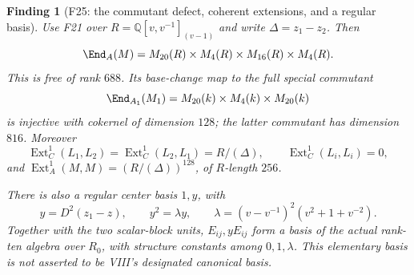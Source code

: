 \documentclass[11pt,a4paper]{article}
\newcommand{\Q}{\mathbb Q}\newcommand{\Z}{\mathbb Z}\newcommand{\C}{\mathbb C}\newcommand{\N}{\mathbb N}\newcommand{\F}{\mathbb F}
\newcommand{\fid}[1]{\textsf{#1}}\newcommand{\gate}[1]{\textsf{#1}}
\theoremstyle{named}\newtheorem{finding}{Finding}[section]
\theoremstyle{definition}\newtheorem{definition}[finding]{Definition}
\theoremstyle{remark}\newtheorem{remark}[finding]{Remark}
\begin{document}
\begin{finding}[\fid{F25}: the commutant defect, coherent extensions, and a regular basis]\label{f:r3deformation}
Use \fid{F21} over $R=\Q[v,v^{-1}]_{(v-1)}$ and write
$\Delta=z_1-z_2$. Then
\[
 \End_A(M)=M_{20}(R)\times M_4(R)\times M_{16}(R)\times M_4(R).
\]
This is free of rank $688$. Its base-change map to the full special
commutant
\[
 \End_{A_1}(M_1)=M_{20}(k)\times M_4(k)\times M_{20}(k)
\]
is injective with cokernel of dimension $128$; the latter commutant has
dimension $816$. Moreover
\[
 \operatorname{Ext}^1_C(L_1,L_2)
 =\operatorname{Ext}^1_C(L_2,L_1)=R/(\Delta),\qquad
 \operatorname{Ext}^1_C(L_i,L_i)=0,
\]
and $\operatorname{Ext}^1_A(M,M)=(R/(\Delta))^{128}$, of $R$-length $256$.

There is also a regular center basis $1,y$, with
\begin{equation}\label{eq:r3basis}
 y=D^2(z_1-z),\qquad
 y^2=\lambda y,\qquad
 \lambda=(v-v^{-1})^2(v^2+1+v^{-2}).
\end{equation}
Together with the two scalar-block units, $E_{ij},yE_{ij}$ form a basis
of the actual rank-ten algebra over $R_0$, with structure constants
among $0,1,\lambda$. This elementary basis is not asserted to be VIII's
designated canonical basis.
\end{finding}
\end{document}
